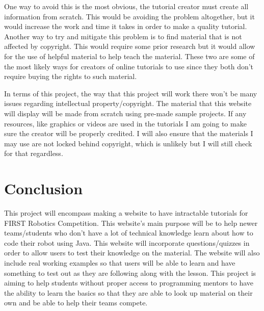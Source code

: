 \documentclass[10pt,twocolumn]{article}
\begin{document}
One way to avoid this is the most obvious, the tutorial creator must create all information from scratch. This would be avoiding the problem altogether, but it would increase the work and time it takes in order to make a quality tutorial. Another way to try and mitigate this problem is to find material that is not affected by copyright. This would require some prior research but it would allow for the use of helpful material to help teach the material. These two are some of the most likely ways for creators of online tutorials to use since they both don't require buying the rights to such material.

In terms of this project, the way that this project will work there won't be many issues regarding intellectual property/copyright. The material that this website will display will be made from scratch using pre-made sample projects. If any resources, like graphics or videos are used in the tutorials I am going to make sure the creator will be properly credited. I will also ensure that the materials I may use are not locked behind copyright, which is unlikely but I will still check for that regardless.

\section{Conclusion}
This project will encompass making a website to have intractable tutorials for FIRST Robotics Competition. This website's main purpose will be to help newer teams/students who don't have a lot of technical knowledge learn about how to code their robot using Java. This website will incorporate questions/quizzes in order to allow users to test their knowledge on the material. The website will also include real working examples so that users will be able to learn and have something to test out as they are following along with the lesson. This project is aiming to help students without proper access to programming mentors to have the ability to learn the basics so that they are able to look up material on their own and be able to help their teams compete. 




\appendix


\printbibliography
\end{document}

